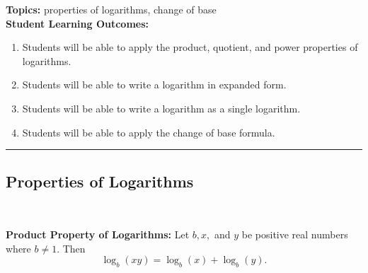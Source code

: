 

\noindent \textbf{Topics:}  properties of logarithms, change of base\\

\noindent \textbf{Student Learning Outcomes:}
\begin{enumerate}
\item Students will be able to apply the product, quotient, and power properties of logarithms.
\item Students will be able to write a logarithm in expanded form.
\item Students will be able to write a logarithm as a single logarithm.
\item Students will be able to apply the change of base formula.
\end{enumerate}

\hrule 

\bigskip

\subsection{Properties of Logarithms} ~


\noindent \textbf{Product Property of Logarithms:} Let $b, x,$ and $y$ be positive real numbers where $b \neq 1.$  Then $$\log_b (xy)=\log_b (x) + \log_b(y).$$   



